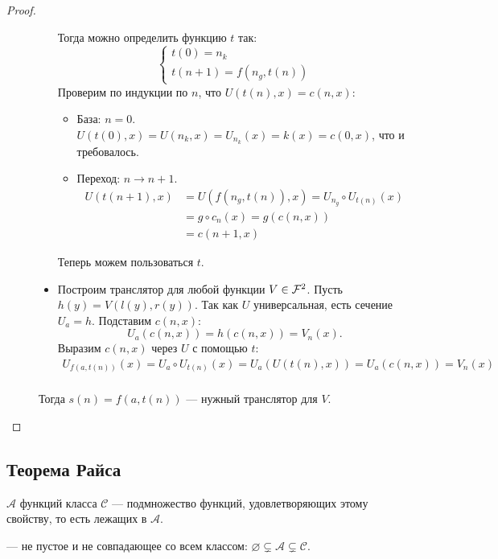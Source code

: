 \begin{proof}
\begin{description}
\begin{proof*}
\begin{itemize}
						Тогда можно определить функцию $t$ так:
						 \[
						\begin{cases}
							t(0) = n_k \\
							t(n+1) = f(n_g, t(n))
						\end{cases}
						\] 
						Проверим по индукции по $ n$, что $U(t(n),x) = c(n,x)$:
						\begin{itemize}
							\item База:  $ n = 0$. $ U(t(0), x) = U(n_k, x) = U_{n_k}(x) = k(x) = c(0, x)$, что и требовалось.
							\item Переход: $ n \to n+1$.
								\begin{align*}
									U(t(n+1), x) & = U(f(n_g, t(n)), x) = U_{n_g} \circ U_{t(n)}(x) \tag{определение $ t$ и свойство  $ f$} \\
												 &= g \circ c_n(x) = g(c(n, x)) \tag{предположение индукции} \\
												 &= c(n+1, x)
								\end{align*}
						\end{itemize}
						Теперь можем пользоваться $ t$.
					\item Построим транслятор для любой функции $ V \in \mathcal{F}^2$.
						Пусть $ h(y) = V(l(y), r(y))$. Так как  $ U$ универсальная, есть сечение $ U_a = h$. Подставим  $ c(n, x)$:
						\[
							U_{a}(c(n, x)) = h(c(n, x)) = V_n(x)
						.\] 
						Выразим $ c(n, x)$ через $ U$ с помощью $ t$:
						\[
						\begin{aligned}
						 	U_{f(a, t(n))}(x) = U_a \circ U_{t(n)}(x) = U_{a}(U(t(n), x)) = U_{a}(c(n, x)) = V_n(x) \\
						\end{aligned}
					\]
				\end{itemize}
				Тогда $ s(n) = f(a, t(n))$ --- нужный транслятор для  $ V$.
			\end{proof*}
    \end{description} 
\end{proof}

\subsection{Теорема Райса}
\begin{defn} 
	 $ \mathcal{A}$ функций класса $ \mathcal{C}$ --- подмножество функций, удовлетворяющих этому свойству, то есть лежащих в $ \mathcal{A}$.

	\noindent
	 --- не пустое и не совпадающее со всем классом: $ \varnothing \subsetneq \mathcal{A} \subsetneq \mathcal{C}$.
\end{defn}

